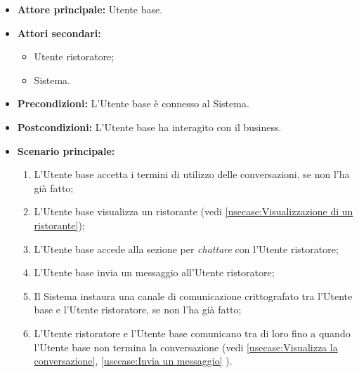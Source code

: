 \label{usecase:Interazione con il business}
\begin{itemize}
	\item \textbf{Attore principale:} Utente base.
	\item \textbf{Attori secondari:}
	      \begin{itemize}
		      \item Utente ristoratore;
		      \item Sistema.
	      \end{itemize}
	\item \textbf{Precondizioni:} L'Utente base è connesso al Sistema.
	\item \textbf{Postcondizioni:} L'Utente base ha interagito con il business.
	\item \textbf{Scenario principale:}
	      \begin{enumerate}
		      \item L'Utente base accetta i termini di utilizzo delle
		            conversazioni, se non l'ha già fatto;

		      \item L'Utente base visualizza un ristorante (vedi
		            \autoref{usecase:Visualizzazione di un ristorante});

		      \item L'Utente base accede alla sezione per \textit{chattare} con
		            l'Utente ristoratore;

		      \item L'Utente base invia un messaggio all'Utente ristoratore;

		      \item Il Sistema instaura una canale di comunicazione
		            crittografato tra l'Utente base e l'Utente ristoratore, se
		            non l'ha già fatto;

		      \item L'Utente ristoratore e l'Utente base comunicano tra di loro
		            fino a quando l'Utente base non termina la conversazione (vedi
		            \autoref{usecase:Visualizza la conversazione}, \autoref{usecase:Invia un
			            messaggio} %
		            ).
	      \end{enumerate}
\end{itemize}

